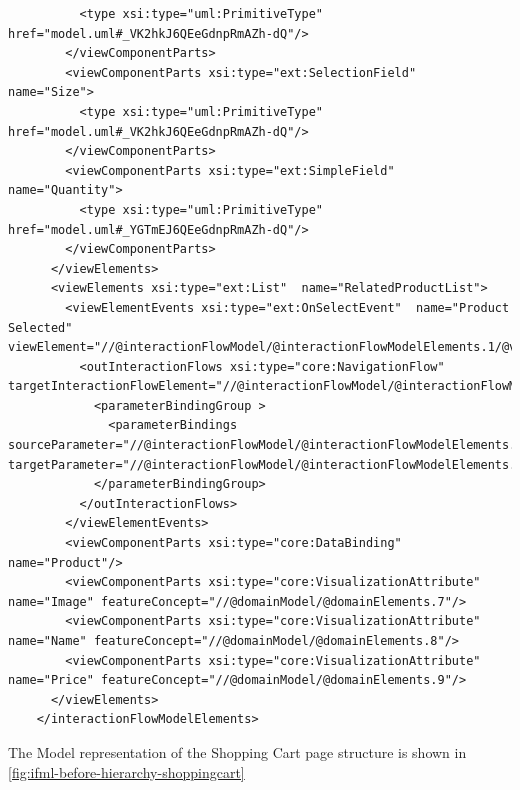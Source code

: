 \begin{lstlisting}
          <type xsi:type="uml:PrimitiveType" href="model.uml#_VK2hkJ6QEeGdnpRmAZh-dQ"/>
        </viewComponentParts>
        <viewComponentParts xsi:type="ext:SelectionField"  name="Size">
          <type xsi:type="uml:PrimitiveType" href="model.uml#_VK2hkJ6QEeGdnpRmAZh-dQ"/>
        </viewComponentParts>
        <viewComponentParts xsi:type="ext:SimpleField"  name="Quantity">
          <type xsi:type="uml:PrimitiveType" href="model.uml#_YGTmEJ6QEeGdnpRmAZh-dQ"/>
        </viewComponentParts>
      </viewElements>
      <viewElements xsi:type="ext:List"  name="RelatedProductList">
        <viewElementEvents xsi:type="ext:OnSelectEvent"  name="Product Selected" viewElement="//@interactionFlowModel/@interactionFlowModelElements.1/@viewElements.2">
          <outInteractionFlows xsi:type="core:NavigationFlow"  targetInteractionFlowElement="//@interactionFlowModel/@interactionFlowModelElements.1">
            <parameterBindingGroup >
              <parameterBindings  sourceParameter="//@interactionFlowModel/@interactionFlowModelElements.0/@viewElements.2/@parameters.0" targetParameter="//@interactionFlowModel/@interactionFlowModelElements.1/@parameters.0"/>
            </parameterBindingGroup>
          </outInteractionFlows>
        </viewElementEvents>
        <viewComponentParts xsi:type="core:DataBinding"  name="Product"/>
        <viewComponentParts xsi:type="core:VisualizationAttribute"  name="Image" featureConcept="//@domainModel/@domainElements.7"/>
        <viewComponentParts xsi:type="core:VisualizationAttribute"  name="Name" featureConcept="//@domainModel/@domainElements.8"/>
        <viewComponentParts xsi:type="core:VisualizationAttribute"  name="Price" featureConcept="//@domainModel/@domainElements.9"/>
      </viewElements>
    </interactionFlowModelElements>
\end{lstlisting}

\newpage
The Model representation of the Shopping Cart page structure is shown in \ref{fig:ifml-before-hierarchy-shoppingcart}

